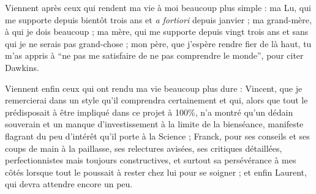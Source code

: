 Viennent après ceux qui rendent ma vie à moi beaucoup plus simple : ma Lu, qui
me supporte depuis bientôt trois ans et \emph{a fortiori} depuis janvier ; ma
grand-mère, à qui je dois beaucoup ; ma mère, qui me supporte depuis vingt trois
ans et sans qui je ne serais pas grand-chose ; mon père, que j'espère rendre
fier de là haut, tu m'as appris à ``ne pas me satisfaire de ne pas comprendre le
monde'', pour citer Dawkins.

Viennent enfin ceux qui ont rendu ma vie beaucoup plus dure : Vincent, que je
remercierai dans un style qu'il comprendra certainement et qui, alors que tout
le prédisposait à être impliqué dans ce projet à 100\%, n'a montré qu'un dédain
souverain et un manque d'investissement à la limite de la bienséance, manifeste
flagrant du peu d'intérêt qu'il porte à la Science ; Franck, pour ses conseils
et ses coups de main à la paillasse, ses relectures avisées, ses critiques
détaillées, perfectionnistes mais toujours constructives, et surtout sa
persévérance à mes côtés lorsque tout le poussait à rester chez lui pour se
soigner ; et enfin Laurent, qui devra attendre encore un peu.


\newpage

\blankpage

\tableofcontents
\newpage
\blankpage


\printacronyms[include-classes=abbrev,name=Abbréviations]


\listoffigures
\listoftables

\blankpage
\blankpage
\clearpage

\setcounter{page}{1}

\sffamily